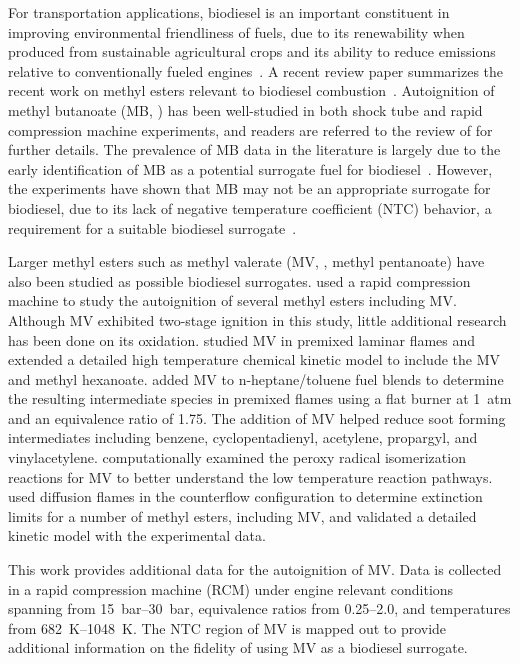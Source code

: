 \documentclass[12pt]{../ussci}
\begin{document}
For transportation applications, biodiesel is an important constituent in
improving environmental friendliness of fuels, due to its renewability when
produced from sustainable agricultural crops and its ability to reduce emissions
relative to conventionally fueled engines~\autocite{Hoekman2012}. A recent
review paper summarizes the recent work on methyl esters relevant to biodiesel
combustion~\autocite{Coniglio2013}. Autoignition of methyl butanoate (MB,
) has been well-studied in both shock tube and rapid compression
machine experiments, and readers are referred to the review of
\textcite{Coniglio2013} for further details. The prevalence of MB data in the
literature is largely due to the early identification of MB as a potential
surrogate fuel for biodiesel~\autocite{Fisher2000}. However, the experiments
have shown that MB may not be an appropriate surrogate for biodiesel, due to its
lack of negative temperature coefficient (NTC) behavior, a requirement for a
suitable biodiesel surrogate~\autocite{Coniglio2013}.

Larger methyl esters such as methyl valerate (MV, , methyl
pentanoate) have also been studied as possible biodiesel surrogates.
\textcite{Hadj-Ali2009} used a rapid compression machine to study the
autoignition of several methyl esters including MV. Although MV exhibited
two-stage ignition in this study, little additional research has been done on
its oxidation. \textcite{Korobeinichev2015} studied MV in premixed laminar
flames and extended a detailed high temperature chemical kinetic model to
include the MV and methyl hexanoate. \textcite{Dmitriev2015} added MV to
n-heptane/toluene fuel blends to determine the resulting intermediate species in
premixed flames using a flat burner at \SI{1}{atm} and an equivalence ratio of
1.75. The addition of MV helped reduce soot forming intermediates including
benzene, cyclopentadienyl, acetylene, propargyl, and vinylacetylene.
\textcite{Hayes2009} computationally examined the peroxy radical isomerization
reactions for MV to better understand the low temperature reaction pathways.
\textcite{Dievart2013} used diffusion flames in the counterflow configuration to
determine extinction limits for a number of methyl esters, including MV, and
validated a detailed kinetic model with the experimental data.

This work provides additional data for the autoignition of MV. Data is collected
in a rapid compression machine (RCM) under engine relevant conditions spanning
from \SIrange{15}{30}{\bar}, equivalence ratios from \numrange{0.25}{2.0}, and
temperatures from \SIrange{682}{1048}{\K}. The NTC region of MV is mapped out to
provide additional information on the fidelity of using MV as a biodiesel
surrogate.
\end{document}
